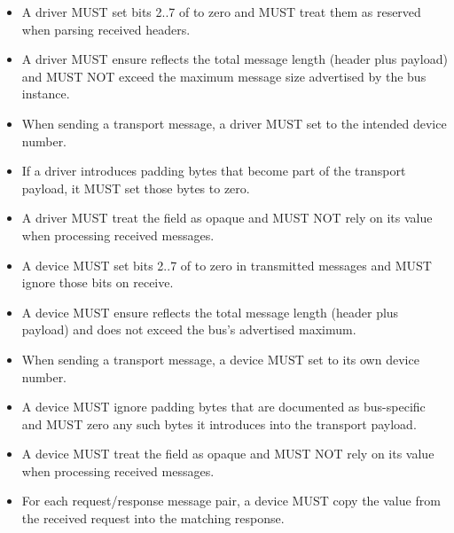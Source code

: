 \begin{itemize}
  \item A driver MUST set bits 2..7 of  to zero and MUST treat them
        as reserved when parsing received headers.
  \item A driver MUST ensure  reflects the total message length
        (header plus payload) and MUST NOT exceed the maximum message size
        advertised by the bus instance.
  \item When sending a transport message, a driver MUST set  to
        the intended device number.
  \item If a driver introduces padding bytes that become part of the transport
        payload, it MUST set those bytes to zero.
  \item A driver MUST treat the  field as opaque and MUST NOT rely
        on its value when processing received messages.
\end{itemize}

\begin{itemize}
  \item A device MUST set bits 2..7 of  to zero in transmitted
        messages and MUST ignore those bits on receive.
  \item A device MUST ensure  reflects the total message length
        (header plus payload) and does not exceed the bus's advertised maximum.
  \item When sending a transport message, a device MUST set  to
        its own device number.
  \item A device MUST ignore padding bytes that are documented as bus-specific
        and MUST zero any such bytes it introduces into the transport payload.
  \item A device MUST treat the  field as opaque and MUST NOT rely
        on its value when processing received messages.
  \item For each request/response message pair, a device MUST copy the
         value from the received request into the matching
        response.
\end{itemize}

